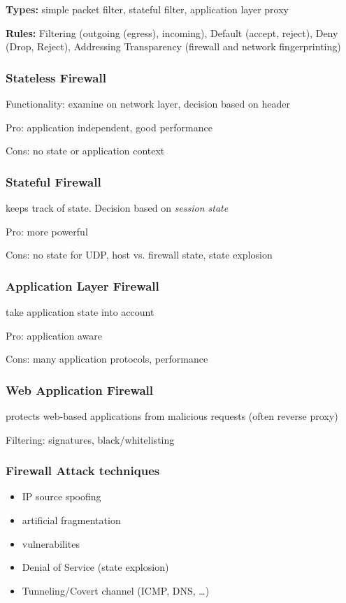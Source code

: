 \documentclass[fs, footer]{latex4ei}
\begin{document}
\begin{multicols*}{4}
{\textbf{Types:} simple packet filter, stateful filter, application layer proxy

\textbf{Rules:} Filtering (outgoing (egress), incoming), Default (accept, reject), Deny (Drop, Reject), Addressing Transparency (firewall and network fingerprinting)

\subsubsection{Stateless Firewall}
Functionality: examine on network layer, decision based on header

Pro: application independent, good performance

Cons: no state or application context

\subsubsection{Stateful Firewall}
keeps track of state. Decision based on \emph{session state}

Pro: more powerful

Cons: no state for UDP, host vs. firewall state, state explosion

 \subsubsection{Application Layer Firewall}
 take application state into account

 Pro: application aware

 Cons: many application protocols, performance

 \subsubsection{Web Application Firewall}
protects web-based applications from malicious requests (often reverse proxy)

Filtering: signatures, black/whitelisting

 \subsubsection{Firewall Attack techniques}
 \begin{itemize}
 	\item IP source spoofing
 	\item artificial fragmentation
 	\item vulnerabilites
 	\item Denial of Service (state explosion)
 	\item Tunneling/Covert channel (ICMP, DNS, \ldots)
 \end{itemize}

}
\end{multicols*}
\end{document}
